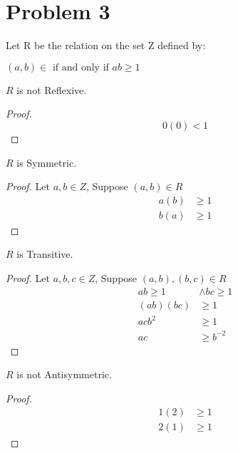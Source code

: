\documentclass{article}
\newenvironment{problem}[1]{
  \nobreak\section*{Problem #1}
}{}
\begin{document}
  \begin{problem}{3}
    Let R be the relation on the set Z defined by:
    \begin{center}
      $(a, b) \in \text{ if and only if } ab \ge 1$
    \end{center}

    $R$ is not Reflexive.
    \begin{proof}
      \begin{equation*}
        0(0) < 1
      \end{equation*}
    \end{proof}

    $R$ is Symmetric.
    \begin{proof}
      Let $a, b \in Z$, Suppose $(a, b) \in R$
      \begin{equation*}
        \begin{split}
          a(b) & \ge 1\\
          b(a) & \ge 1
        \end{split}
      \end{equation*}
    \end{proof}

    $R$ is Transitive.
    \begin{proof}
      Let $a, b, c \in Z$, Suppose $(a, b), (b, c) \in  R$
      \begin{equation*}
        \begin{split}
          ab \ge 1 & \wedge bc \ge 1\\
          (ab)(bc) & \ge 1\\
          acb^2 & \ge 1\\
          ac & \ge b^{-2}
        \end{split}
      \end{equation*}
    \end{proof}

    $R$ is not Antisymmetric.
    \begin{proof}
      \begin{equation*}
        \begin{split}
          1(2) & \ge 1\\
          2(1) & \ge 1
        \end{split}
      \end{equation*}
    \end{proof}
  \end{problem}
\end{document}
